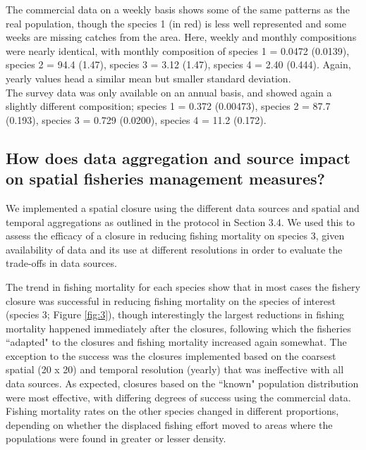 \documentclass[review]{elsarticle}
\begin{document}
The commercial data on a weekly basis shows some of the same patterns as the
real population, though the species 1 (in red) is less well represented and
some weeks are missing catches from the area. Here, weekly and monthly
compositions were nearly identical, with monthly composition of species 1 =
0.0472 (0.0139), species 2 = 94.4 (1.47), species 3 = 3.12 (1.47), species 4 =
2.40 (0.444). Again, yearly values head a similar mean but smaller standard
deviation.\\

The survey data was only available on an annual basis, and showed again a
slightly different composition; species 1 = 0.372 (0.00473), species 2 = 87.7
(0.193), species 3 = 0.729 (0.0200), species 4 = 11.2 (0.172).

\subsection{How does data aggregation and source impact on spatial fisheries
	management measures?}

We implemented a spatial closure using the different data sources and spatial
and temporal aggregations as outlined in the protocol in Section 3.4. We used
this to assess the efficacy of a closure in reducing fishing mortality on
species 3, given availability of data and its use at different resolutions in
order to evaluate the trade-offs in data sources. 

The trend in fishing mortality for each species show that in most cases the
fishery closure was successful in reducing fishing mortality on the species of
interest (species 3; Figure \ref{fig:3}), though interestingly the largest
reductions in fishing mortality happened immediately after the closures,
following which the fisheries ``adapted" to the closures and fishing mortality
increased again somewhat. The exception to the success was the closures
implemented based on the coarsest spatial (20 x 20) and temporal resolution
(yearly) that was ineffective with all data sources. As expected, closures
based on the ``known" population distribution were most effective, with
differing degrees of success using the commercial data. Fishing mortality rates
on the other species changed in different proportions, depending on whether the
displaced fishing effort moved to areas where the populations were found in
greater or lesser density. \\
\end{document}
